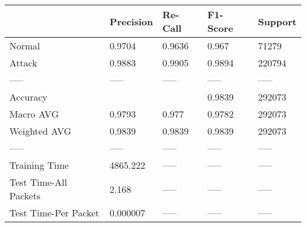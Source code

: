 \begin{tabular}{lllll}
\toprule
{} & Precision & Re-Call & F1-Score & Support \\
\midrule
Normal                &    0.9704 &  0.9636 &    0.967 &   71279 \\
Attack                &    0.9883 &  0.9905 &   0.9894 &  220794 \\
-----                 &     ----- &   ----- &    ----- &   ----- \\
Accuracy              &           &         &   0.9839 &  292073 \\
Macro AVG             &    0.9793 &   0.977 &   0.9782 &  292073 \\
Weighted AVG          &    0.9839 &  0.9839 &   0.9839 &  292073 \\
-----                 &     ----- &   ----- &    ----- &   ----- \\
Training Time         &  4865.222 &   ----- &    ----- &   ----- \\
Test Time-All Packets &     2.168 &   ----- &    ----- &   ----- \\
Test Time-Per Packet  &  0.000007 &   ----- &    ----- &   ----- \\
\bottomrule
\end{tabular}
